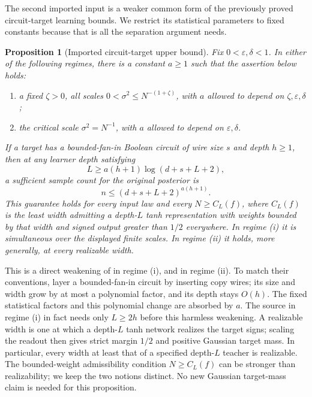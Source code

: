\documentclass[11pt]{article}
\newtheorem{proposition}[theorem]{Proposition}
\theoremstyle{remark}
\begin{document}
The second imported input is a weaker common form of the previously
proved circuit-target learning bounds. We restrict its statistical
parameters to fixed constants because that is all the separation
argument needs.

\begin{proposition}[Imported circuit-target upper bound]
\label{prop:target-upper}
Fix $0<\varepsilon,\delta<1$. In either of the following regimes,
there is a constant $a\ge1$ such that the assertion below holds:
\begin{enumerate}[label=(\roman*),leftmargin=*]
 \item a fixed $\zeta>0$, all scales
       $0<\sigma^2\le N^{-(1+\zeta)}$, with $a$ allowed to depend
       on $\zeta,\varepsilon,\delta$;
 \item the critical scale $\sigma^2=N^{-1}$, with $a$ allowed to
       depend on $\varepsilon,\delta$.
\end{enumerate}
If a target has a bounded-fan-in Boolean circuit of wire size $s$
and depth $h\ge1$, then at any learner depth satisfying
\[
 L\ge a(h+1)\log(d+s+L+2),
\]
a sufficient sample count for the original posterior is
\[
 n\le(d+s+L+2)^{a(h+1)}.
\]
This guarantee holds for every input law and every
$N\ge C_L(f)$, where $C_L(f)$ is the least width admitting a
depth-$L$ tanh representation with weights bounded by that width
and signed output greater than $1/2$ everywhere. In regime (i) it
is simultaneous over the displayed finite scales. In regime (ii)
it holds, more generally, at every realizable width.
\end{proposition}

This is a direct weakening of
\cite[``Precision-independent threshold-circuit learning'']{unrestricted}
in regime (i), and
\cite[``Real threshold teachers without a weight bound'']{critical}
in regime (ii). To match their conventions, layer a bounded-fan-in
circuit by inserting copy wires; its size and width grow by at most
a polynomial factor, and its depth stays $O(h)$.
The fixed statistical factors and this polynomial change are
absorbed by $a$. The source in regime (i) in fact needs only
$L\ge2h$ before this harmless weakening. A realizable width is one
at which a depth-$L$ tanh network realizes the target signs; scaling
the readout then gives strict margin $1/2$ and positive Gaussian
target mass. In particular, every width at least that of a specified
depth-$L$ teacher is realizable. The bounded-weight admissibility
condition $N\ge C_L(f)$ can be stronger than realizability; we keep
the two notions distinct. No new Gaussian target-mass claim is needed
for this proposition.
\end{document}
